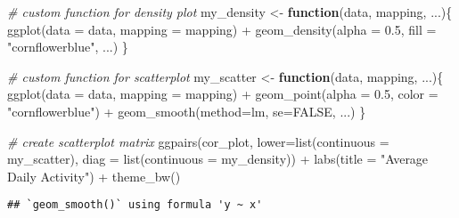 \documentclass[
]{article}
\newenvironment{Shaded}{\begin{snugshade}}{\end{snugshade}}
\newcommand{\AttributeTok}[1]{\textcolor[rgb]{0.77,0.63,0.00}{#1}}
\newcommand{\CommentTok}[1]{\textcolor[rgb]{0.56,0.35,0.01}{\textit{#1}}}
\newcommand{\ConstantTok}[1]{\textcolor[rgb]{0.00,0.00,0.00}{#1}}
\newcommand{\ControlFlowTok}[1]{\textcolor[rgb]{0.13,0.29,0.53}{\textbf{#1}}}
\newcommand{\FloatTok}[1]{\textcolor[rgb]{0.00,0.00,0.81}{#1}}
\newcommand{\FunctionTok}[1]{\textcolor[rgb]{0.00,0.00,0.00}{#1}}
\newcommand{\NormalTok}[1]{#1}
\newcommand{\OtherTok}[1]{\textcolor[rgb]{0.56,0.35,0.01}{#1}}
\newcommand{\SpecialCharTok}[1]{\textcolor[rgb]{0.00,0.00,0.00}{#1}}
\newcommand{\StringTok}[1]{\textcolor[rgb]{0.31,0.60,0.02}{#1}}
\begin{document}
\begin{Shaded}
\begin{Highlighting}[]
\CommentTok{\# custom function for density plot}
\NormalTok{my\_density }\OtherTok{\textless{}{-}} \ControlFlowTok{function}\NormalTok{(data, mapping, ...)\{}
  \FunctionTok{ggplot}\NormalTok{(}\AttributeTok{data =}\NormalTok{ data, }\AttributeTok{mapping =}\NormalTok{ mapping) }\SpecialCharTok{+} 
    \FunctionTok{geom\_density}\NormalTok{(}\AttributeTok{alpha =} \FloatTok{0.5}\NormalTok{,}
                 \AttributeTok{fill =} \StringTok{"cornflowerblue"}\NormalTok{, ...)}
\NormalTok{\}}

\CommentTok{\# custom function for scatterplot}
\NormalTok{my\_scatter }\OtherTok{\textless{}{-}} \ControlFlowTok{function}\NormalTok{(data, mapping, ...)\{}
  \FunctionTok{ggplot}\NormalTok{(}\AttributeTok{data =}\NormalTok{ data, }\AttributeTok{mapping =}\NormalTok{ mapping) }\SpecialCharTok{+} 
    \FunctionTok{geom\_point}\NormalTok{(}\AttributeTok{alpha =} \FloatTok{0.5}\NormalTok{,}
               \AttributeTok{color =} \StringTok{"cornflowerblue"}\NormalTok{) }\SpecialCharTok{+} 
    \FunctionTok{geom\_smooth}\NormalTok{(}\AttributeTok{method=}\NormalTok{lm, }
                \AttributeTok{se=}\ConstantTok{FALSE}\NormalTok{, ...)}
\NormalTok{\}}


\CommentTok{\# create scatterplot matrix}
\FunctionTok{ggpairs}\NormalTok{(cor\_plot, }
        \AttributeTok{lower=}\FunctionTok{list}\NormalTok{(}\AttributeTok{continuous =}\NormalTok{ my\_scatter), }
        \AttributeTok{diag =} \FunctionTok{list}\NormalTok{(}\AttributeTok{continuous =}\NormalTok{ my\_density)) }\SpecialCharTok{+}
  \FunctionTok{labs}\NormalTok{(}\AttributeTok{title =} \StringTok{"Average Daily Activity"}\NormalTok{) }\SpecialCharTok{+}
  \FunctionTok{theme\_bw}\NormalTok{()}
\end{Highlighting}
\end{Shaded}

\begin{verbatim}
## `geom_smooth()` using formula 'y ~ x'
\end{verbatim}
\end{document}
